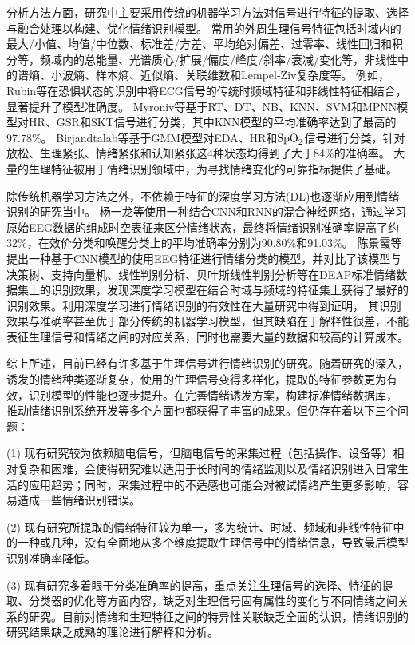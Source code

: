 分析方法方面，研究中主要采用传统的机器学习方法对信号进行特征的提取、选择与融合处理以构建、优化情绪识别模型。
常用的外周生理信号特征\cite{Bota2019}包括时域内的最大/小值、均值/中位数、标准差/方差、平均绝对偏差、过零率、线性回归和积分等，频域内的总能量、光谱质心/扩展/偏度/峰度/斜率/衰减/变化等，非线性中的谱熵、小波熵、样本熵、近似熵、关联维数和Lempel-Ziv复杂度等。
例如，Rubin等\cite{Rubin2016}在恐惧状态的识别中将ECG信号的传统时频域特征和非线性特征相结合，显著提升了模型准确度。
Myroniv等\cite{Myroniv2017}基于RT、DT、NB、KNN、SVM和MPNN模型对HR、GSR和SKT信号进行分类，其中KNN模型的平均准确率达到了最高的97.78\%。
Birjandtalab等\cite{Birjandtalab2016}基于GMM模型对EDA、HR和${\rm SpO}_{\rm 2}$信号进行分类，针对放松、生理紧张、情绪紧张和认知紧张这4种状态均得到了大于84\%的准确率。
大量的生理特征被用于情绪识别领域中，为寻找情绪变化的可靠指标提供了基础。

除传统机器学习方法之外，不依赖于特征的深度学习方法(DL)也逐渐应用到情绪识别的研究当中。
杨一龙等\cite{YangYilong2018}使用一种结合CNN和RNN的混合神经网络，通过学习原始EEG数据的组成时空表征来区分情绪状态，最终将情绪识别准确率提高了约32\%，在效价分类和唤醒分类上的平均准确率分别为90.80\%和91.03\%。
陈景霞等\cite{ChenJX2019}提出一种基于CNN模型的使用EEG特征进行情绪分类的模型，并对比了该模型与决策树、支持向量机、线性判别分析、贝叶斯线性判别分析等在DEAP标准情绪数据集上的识别效果，发现深度学习模型在结合时域与频域的特征集上获得了最好的识别效果。利用深度学习进行情绪识别的有效性在大量研究中得到证明，
其识别效果与准确率甚至优于部分传统的机器学习模型，但其缺陷在于解释性很差，不能表征生理信号和情绪之间的对应关系，同时也需要大量的数据和较高的计算成本。

综上所述，目前已经有许多基于生理信号进行情绪识别的研究。随着研究的深入，诱发的情绪种类逐渐复杂，使用的生理信号变得多样化，提取的特征参数更为有效，识别模型的性能也逐步提升。在完善情绪诱发方案，构建标准情绪数据库，
推动情绪识别系统开发等多个方面也都获得了丰富的成果。但仍存在着以下三个问题：

(1) 现有研究较为依赖脑电信号，但脑电信号的采集过程（包括操作、设备等）相对复杂和困难，会使得研究难以适用于长时间的情绪监测以及情绪识别进入日常生活的应用趋势；同时，采集过程中的不适感也可能会对被试情绪产生更多影响，容易造成一些情绪识别错误。

(2) 现有研究所提取的情绪特征较为单一，多为统计、时域、频域和非线性特征中的一种或几种，没有全面地从多个维度提取生理信号中的情绪信息，导致最后模型识别准确率降低。

(3) 现有研究多着眼于分类准确率的提高，重点关注生理信号的选择、特征的提取、分类器的优化等方面内容，缺乏对生理信号固有属性的变化与不同情绪之间关系的研究。目前对情绪和生理特征之间的特异性关联缺乏全面的认识，情绪识别的研究结果缺乏成熟的理论进行解释和分析。

